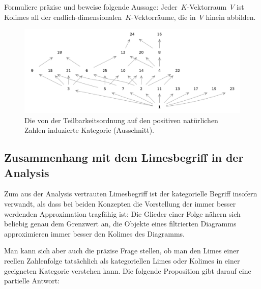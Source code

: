 \begin{aufg}Formuliere präzise und beweise folgende Aussage:
Jeder~$K$-Vektorraum~$V$ ist Kolimes all der
endlich-dimensionalen~$K$-Vektorräume, die in~$V$ hinein abbilden.
\end{aufg}

\begin{figure}
  \centering
  \includegraphics[scale=0.35]{teilbarkeitsordnung.png}
  \caption{\label{teilbarkeitsordnung}Die von der Teilbarkeitsordnung auf den
  positiven natürlichen Zahlen induzierte Kategorie (Ausschnitt).}
\end{figure}


\subsection{Zusammenhang mit dem Limesbegriff in der Analysis}

Zum aus der Analysis vertrauten Limesbegriff ist der kategorielle Begriff
insofern verwandt, als dass bei beiden Konzepten die Vorstellung der immer
besser werdenden Approximation tragfähig ist: Die Glieder einer Folge
nähern sich beliebig genau dem Grenzwert an, die Objekte eines filtrierten
Diagramms approximieren immer besser den Kolimes des Diagramms.

Man kann sich aber auch die präzise Frage stellen, ob man den Limes einer reellen
Zahlenfolge tatsächlich als kategoriellen Limes oder Kolimes in einer
geeigneten Kategorie verstehen kann. Die folgende Proposition gibt darauf eine
partielle Antwort:

